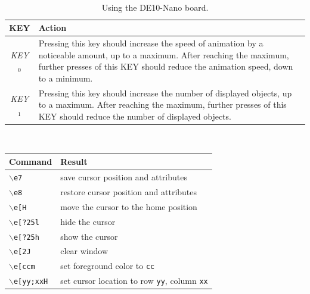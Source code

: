 \documentclass[epsfig,10pt,fullpage]{article}
\newcommand{\CommonDocsPath}{../../common/docs}
\begin{document}
\begin{table}[h]
\caption{Using the DE10-Nano board.}
~\\
\centering
\label{tab:action2}
\begin{tabular}{c|p{13cm}}
{\bf KEY} & {\bf Action} \\ \hline
\rule{0cm}{12pt}{\it KEY}$_0$ & Pressing this key should increase the speed of animation by a noticeable amount, up to a maximum. After reaching the maximum, further presses of this KEY should reduce the animation speed, down to a minimum.\\
{\it KEY}$_1$ & Pressing this key should increase the number of displayed objects, up to a maximum. After reaching the maximum, further presses of this KEY should reduce the number of displayed objects.\\
\end{tabular}
\end{table}

{}
\begin{table}[H]
~\\
\centering
\label{tab:vt100}
\begin{tabular}{l|l}
          {\bf Command} & {\bf Result} \\ \hline
          \rule{0cm}{12pt}\texttt{$\backslash$e7} & save cursor position and attributes\\
          \texttt{$\backslash$e8} & restore cursor position and attributes\\
          \texttt{$\backslash$e[H} & move the cursor to the home position\\
          \texttt{$\backslash$e[?25l} & hide the cursor \\
          \texttt{$\backslash$e[?25h} & show the cursor \\
          \texttt{$\backslash$e[2J} & clear window \\
          \texttt{$\backslash$e[ccm} & set foreground color to \texttt{cc} \\
          \texttt{$\backslash$e[yy;xxH} & set cursor location to row \texttt{yy}, column \texttt{xx}
          
\end{tabular}
\end{table}
~\\
~\\
\noindent
\newpage

\clearpage
\end{document}
